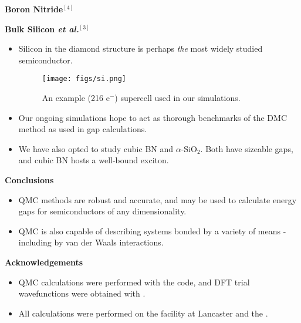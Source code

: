 \documentclass[hyperref={draft}, table, xcdraw]{beamer}
\newcommand{\red}[1]{{\bf\color{EmphCol}{#1}}}
\begin{document}
\begin{frame}[fragile]
\begin{columns}[T]
\begin{column}{.47\textwidth}
\begin{block}{{\bf\large Boron Nitride$^{[4]}$}}
\end{block}


\begin{block}{{\bf\large Bulk Silicon {\it\large et al.}$^{[3]}$}}
\begin{itemize}
\item Silicon in the diamond structure is perhaps {\it the} most widely
studied semiconductor.
\begin{figure}[H]

  \centering
  \texttt{[image: figs/si.png]}
  \caption{An example (216 e$^-$) supercell used in our simulations.}
  \label{bhbn_332}

\end{figure}

\item Our ongoing simulations hope to act as thorough benchmarks of the DMC
method as used in gap calculations.

\item We have also opted to study cubic BN and $\alpha$-SiO$_2$. Both have
sizeable gaps, and cubic BN hosts a well-bound exciton.

\end{itemize}
\end{block}


\begin{block}{{\bf\large Conclusions}}
\begin{itemize}
\item QMC methods are robust and accurate, and may be used to calculate energy
gaps for semiconductors of any dimensionality.
\item QMC is also capable of describing systems bonded by a variety of means -
including by van der Waals interactions.
\end{itemize}
\end{block}

\begin{block}{{\bf\large Acknowledgements}}
\begin{itemize}
\item QMC calculations were performed with the \red{\textsc{CASINO}} code, and
DFT trial wavefunctions were obtained with \red{\textsc{CASTEP}}.
\item All calculations were performed on the \red{HEC} facility at Lancaster
and the \red{N8 HPC}.
\end{itemize}
\end{block}
\end{column}
\end{columns}


\end{frame}
\end{document}
